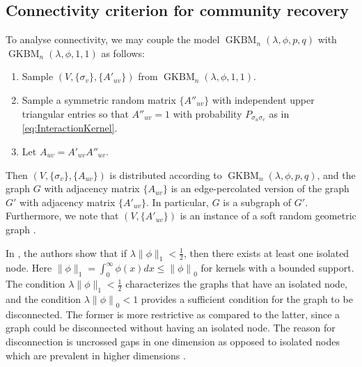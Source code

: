 \documentclass[letterpaper,11pt]{article}
\theoremstyle{definition}
\newcommand{\zeronorm}[1]{{\lVert#1\rVert}_0}
\numberwithin{equation}{section}
\newcommand{\GKBM}{\operatorname{GKBM}}
\newcommand{\la}{\lambda}
\theoremstyle{definition}
\newcommand{\zeronorm}[1]{{\lVert#1\rVert}_0}
\numberwithin{equation}{section}
\newcommand{\GKBM}{\operatorname{GKBM}}
\newcommand{\la}{\lambda}
\theoremstyle{thmstyletwo}%
\begin{document}
\subsection{Connectivity criterion for community recovery}
\label{sec:connectivity}
To analyse connectivity, we may couple the model 
$\GKBM_n(\la, \phi, p, q)$ with $\GKBM_n(\la, \phi, 1, 1)$
as follows:
\begin{enumerate}
\item Sample $( V,\{\sigma_v\},\{A'_{uv}\})$ from $\GKBM_n(\la, \phi, 1, 1)$.
\item Sample a symmetric random matrix $\{A''_{uv}\}$ with independent upper triangular entries
so that $A''_{uv}=1$ with probability $P_{\sigma_u \sigma_v}$ as in \eqref{eq:InteractionKernel}.
\item Let $A_{uv} = A'_{uv} A''_{uv}$.
\end{enumerate}
Then $(V,\{\sigma_v\},\{A_{uv}\})$ is distributed according to $\GKBM_n(\la, \phi, p, q)$,
and the graph $G$ with adjacency matrix $\{A_{uv}\}$ is an edge-percolated version of
the graph $G'$ with adjacency matrix $\{A'_{uv}\}$.  In particular, $G$ is a subgraph of $G'$.
Furthermore, we note that $(V, \{A'_{uv}\})$ is an instance of a soft random geometric graph
\cite{penrose2016connectivity,Wilsher_Dettmann_Ganesh_2023}.

In \cite{Wilsher_Dettmann_Ganesh_2023}, the authors show that if $\la \|\phi\|_1 <\frac{1}{2}$, then there exists at least one isolated node. Here $\|\phi\|_1 = \int_0^\infty \phi(x)dx \le  \zeronorm{\phi}$ for kernels with a bounded support. The condition $\la \|\phi\|_1 <\frac{1}{2}$ characterizes the graphs that have an isolated node, and the condition $\la \zeronorm{\phi} <1$ provides a sufficient condition for the graph to be disconnected. The former is more restrictive as compared to the latter, since a graph could be disconnected without having an isolated node. The reason for disconnection is uncrossed gaps in one dimension \cite{Wilsher_Dettmann_Ganesh_2023} as opposed to isolated nodes which are prevalent in higher dimensions \cite{penrose2016connectivity}.
\end{document}

